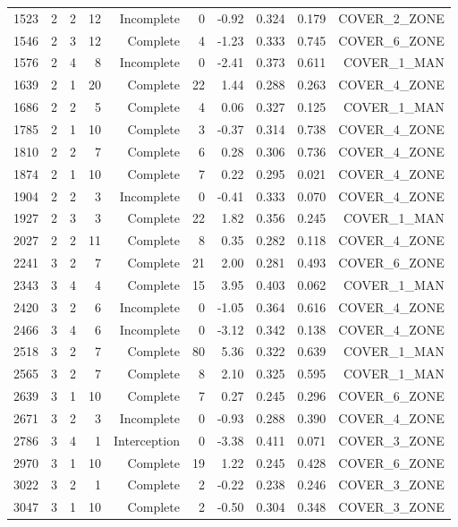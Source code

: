 \begin{tabular}{rrrrrrrrrr}
1523 & 2 & 2 & 12 & Incomplete & 0 & -0.92 & 0.324 & 0.179 & COVER\_2\_ZONE \\
1546 & 2 & 3 & 12 & Complete & 4 & -1.23 & 0.333 & 0.745 & COVER\_6\_ZONE \\
1576 & 2 & 4 & 8 & Incomplete & 0 & -2.41 & 0.373 & 0.611 & COVER\_1\_MAN \\
1639 & 2 & 1 & 20 & Complete & 22 & 1.44 & 0.288 & 0.263 & COVER\_4\_ZONE \\
1686 & 2 & 2 & 5 & Complete & 4 & 0.06 & 0.327 & 0.125 & COVER\_1\_MAN \\
1785 & 2 & 1 & 10 & Complete & 3 & -0.37 & 0.314 & 0.738 & COVER\_4\_ZONE \\
1810 & 2 & 2 & 7 & Complete & 6 & 0.28 & 0.306 & 0.736 & COVER\_4\_ZONE \\
1874 & 2 & 1 & 10 & Complete & 7 & 0.22 & 0.295 & 0.021 & COVER\_4\_ZONE \\
1904 & 2 & 2 & 3 & Incomplete & 0 & -0.41 & 0.333 & 0.070 & COVER\_4\_ZONE \\
1927 & 2 & 3 & 3 & Complete & 22 & 1.82 & 0.356 & 0.245 & COVER\_1\_MAN \\
2027 & 2 & 2 & 11 & Complete & 8 & 0.35 & 0.282 & 0.118 & COVER\_4\_ZONE \\
2241 & 3 & 2 & 7 & Complete & 21 & 2.00 & 0.281 & 0.493 & COVER\_6\_ZONE \\
2343 & 3 & 4 & 4 & Complete & 15 & 3.95 & 0.403 & 0.062 & COVER\_1\_MAN \\
2420 & 3 & 2 & 6 & Incomplete & 0 & -1.05 & 0.364 & 0.616 & COVER\_4\_ZONE \\
2466 & 3 & 4 & 6 & Incomplete & 0 & -3.12 & 0.342 & 0.138 & COVER\_4\_ZONE \\
2518 & 3 & 2 & 7 & Complete & 80 & 5.36 & 0.322 & 0.639 & COVER\_1\_MAN \\
2565 & 3 & 2 & 7 & Complete & 8 & 2.10 & 0.325 & 0.595 & COVER\_1\_MAN \\
2639 & 3 & 1 & 10 & Complete & 7 & 0.27 & 0.245 & 0.296 & COVER\_6\_ZONE \\
2671 & 3 & 2 & 3 & Incomplete & 0 & -0.93 & 0.288 & 0.390 & COVER\_4\_ZONE \\
2786 & 3 & 4 & 1 & Interception & 0 & -3.38 & 0.411 & 0.071 & COVER\_3\_ZONE \\
2970 & 3 & 1 & 10 & Complete & 19 & 1.22 & 0.245 & 0.428 & COVER\_6\_ZONE \\
3022 & 3 & 2 & 1 & Complete & 2 & -0.22 & 0.238 & 0.246 & COVER\_3\_ZONE \\
3047 & 3 & 1 & 10 & Complete & 2 & -0.50 & 0.304 & 0.348 & COVER\_3\_ZONE \\

\end{tabular}
